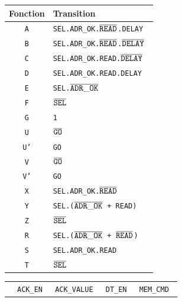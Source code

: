 \documentclass{article}
\begin{document}
\begin{table}[H]
\centering
\begingroup
\setlength{\tabcolsep}{5pt}
\renewcommand{\arraystretch}{1.1}
\begin{tabular}{ | c | l | }
\hline
Fonction    &   Transition  \\
\hline
\texttt{A}  &   \tt{SEL.ADR\_OK.$\overline{\tt{READ}}$.DELAY                     }\\
\texttt{B}  &   \tt{SEL.ADR\_OK.$\overline{\tt{READ}}$.$\overline{\tt{DELAY}}$        }\\
\texttt{C}  &   \tt{SEL.ADR\_OK.READ.$\overline{\tt{DELAY}}$                     }\\
\texttt{D}  &   \tt{SEL.ADR\_OK.READ.DELAY                                  }\\
\texttt{E}  &   \tt{SEL.$\overline{\tt{ADR\_OK}}$                                }\\
\texttt{F}  &   \tt{$\overline{\tt{SEL}}$                                        }\\
\texttt{G}  &   \tt{1                                                       }\\
\hline
\texttt{U}  &   \tt{$\overline{\tt{GO}}$                                         }\\
\texttt{U'} &   \tt{GO                                                      }\\
\hline
\texttt{V}  &   \tt{$\overline{\tt{GO}}$                                         }\\
\texttt{V'} &   \tt{GO                                                      }\\
\hline
\texttt{X}  &   \tt{SEL.ADR\_OK.$\overline{\tt{READ}}$                           }\\
\texttt{Y}  &   \tt{SEL.($\overline{\tt{ADR\_OK}}$ + READ)                       }\\
\texttt{Z}  &   \tt{$\overline{\tt{SEL}}$                                        }\\
\hline
\texttt{R}  &   \tt{SEL.($\overline{\tt{ADR\_OK}}$ + $\overline{\tt{READ}}$)          }\\
\texttt{S}  &   \tt{SEL.ADR\_OK.READ                                        }\\
\texttt{T}  &   \tt{$\overline{\tt{SEL}}$                                        }\\
\hline
\end{tabular}
\begin{tabular}{| l | l | l | l | l |}
\hline
                    & \tt{ACK\_EN}      & \tt{ACK\_VALUE}   & \tt{DT\_EN} & \tt{MEM\_CMD}   \\

\end{tabular}
\end{table}
\end{document}
